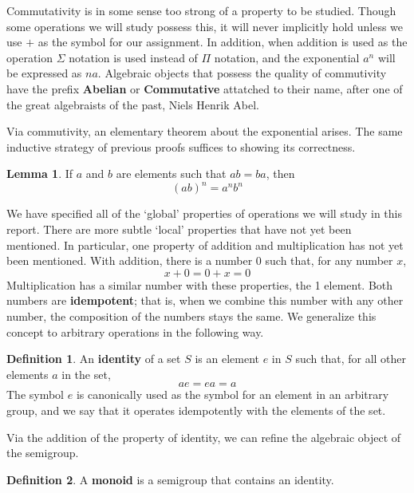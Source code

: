 \documentclass[12pt]{amsbook}
\theoremstyle{definition}
\newtheorem{lemma}[theorem]{Lemma}
\newtheorem{definition}{Definition}
\begin{document}
Commutativity is in some sense too strong of a property to be studied. Though some operations we will study possess this, it will never implicitly hold unless we use $+$ as the symbol for our assignment. In addition, when addition is used as the operation $\Sigma$ notation is used instead of $\Pi$ notation, and the exponential $a^n$ will be expressed as $na$. Algebraic objects that possess the quality of commutivity have the prefix {\bf Abelian}  or {\bf Commutative}  attatched to their name, after one of the great algebraists of the past, Niels Henrik Abel.

Via commutivity, an elementary theorem about the exponential arises. The same inductive strategy of previous proofs suffices to showing its correctness.

\begin{lemma}
    If $a$ and $b$ are elements such that $ab = ba$, then
    \[ (ab)^n = a^nb^n \]
\end{lemma}

We have specified all of the `global' properties of operations we will study in this report. There are more subtle `local' properties that have not yet been mentioned. In particular, one property of addition and multiplication has not yet been mentioned. With addition, there is a number 0 such that, for any number $x$,
%
\[x + 0 = 0 + x = 0\]
%
Multiplication has a similar number with these properties, the 1 element. Both numbers are {\bf idempotent}; that is, when we combine this number with any other number, the composition of the numbers stays the same. We generalize this concept to arbitrary operations in the following way.

\begin{definition}
    An {\bf identity} of a set $S$ is an element $e$ in $S$ such that, for all other elements $a$ in the set,
    \[ ae = ea = a \]
    The symbol $e$ is canonically used as the symbol for an element in an arbitrary group, and we say that it operates idempotently with the elements of the set.
\end{definition}

Via the addition of the property of identity, we can refine the algebraic object of the semigroup.

\begin{definition}
    A {\bf monoid} is a semigroup that contains an identity.
\end{definition}
\end{document}
